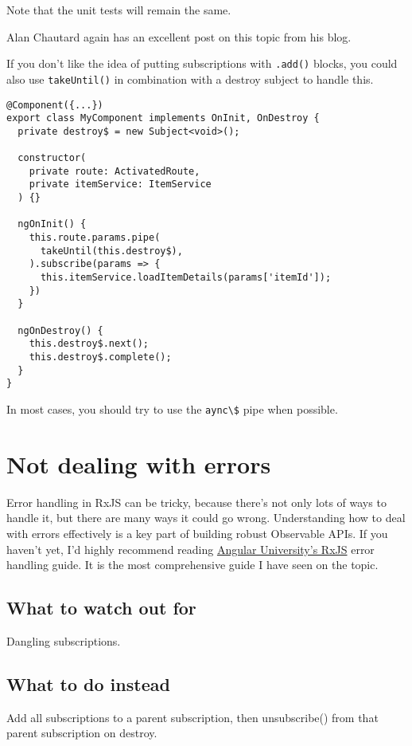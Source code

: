Note that the unit tests will remain the same.

Alan Chautard again has an excellent post on this topic from his blog.

If you don’t like the idea of putting subscriptions with \lstinline{.add()} blocks, you could also use \lstinline{takeUntil()} in combination with a destroy subject to handle this.

\begin{lstlisting}
@Component({...})
export class MyComponent implements OnInit, OnDestroy {
  private destroy$ = new Subject<void>();

  constructor(
    private route: ActivatedRoute,
    private itemService: ItemService
  ) {}

  ngOnInit() {
    this.route.params.pipe(
      takeUntil(this.destroy$),
    ).subscribe(params => {
      this.itemService.loadItemDetails(params['itemId']);
    })
  }

  ngOnDestroy() {
    this.destroy$.next();
    this.destroy$.complete();
  }
}  
\end{lstlisting}

In most cases, you should try to use the \lstinline{aync\$} pipe when possible.

\section{Not dealing with errors}
Error handling in RxJS can be tricky, because there’s not only lots of ways to handle it, but there are many ways it could go wrong. Understanding how to deal with errors effectively is a key part of building robust Observable APIs.
If you haven’t yet, I’d highly recommend reading \href{https://blog.angular-university.io/rxjs-error-handling/}{Angular University’s RxJS} error handling guide. It is the most comprehensive guide I have seen on the topic.

\subsection{What to watch out for}
Dangling subscriptions.

\subsection{What to do instead}
Add all subscriptions to a parent subscription, then unsubscribe() from that parent subscription on destroy.


